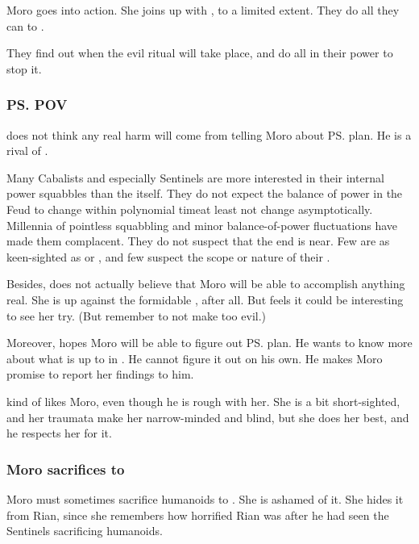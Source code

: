 Moro goes into action. 
She joins up with \Tiroco, to a limited extent. 
They do all they can to . 

They find out when the evil ritual will take place, and do all in their power to stop it. 





\subsubsection{\ps{\Nasshikerr} POV}
\Nasshikerr{} does not think any real harm will come from telling Moro about \ps{\Secherdamon} plan. 
He is a rival of \Secherdamon. 

Many Cabalists and especially Sentinels are more interested in their internal power squabbles than the  itself. 
They do not expect the balance of power in the Feud to change within polynomial time\prikker at least not change asymptotically. 
Millennia of pointless squabbling and minor balance-of-power fluctuations have made them complacent. 
They do not suspect that the end is near. 
Few are as keen-sighted as \Secherdamon{} or \Azraid, and few suspect the scope or nature of their . 

Besides, \Nasshikerr{} does not actually believe that Moro will be able to accomplish anything real. 
She is up against the formidable , after all. 
But \Nasshikerr{} feels it could be interesting to see her try. 
(But remember to not make \Nasshikerr{} too evil.) 

Moreover, \Nasshikerr{} hopes Moro will be able to figure out \ps{\Secherdamon} plan. 
He wants to know more about what \Secherdamon{} is up to in \Malcur. 
He cannot figure it out on his own. 
He makes Moro promise to report her findings to him. 

\Nasshikerr{} kind of likes Moro, even though he is rough with her. 
She is a bit short-sighted, and her traumata make her narrow-minded and blind, but she does her best, and he respects her for it. 





\subsubsection{Moro sacrifices to {\Nasshikerr}}
Moro must sometimes sacrifice humanoids to \Nasshikerr. 
She is ashamed of it. 
She hides it from Rian, since she remembers how horrified Rian was after he had seen the Sentinels sacrificing humanoids. 

